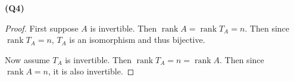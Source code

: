 \documentclass[12pt, a4paper]{article}
\newcommand{\rank}{\operatorname{rank}}
\begin{document}
\textbf{(Q4)}
\begin{proof}
    First suppose $A$ is invertible. Then $\rank A = \rank T_A = n$.
    Then since $\rank T_A = n$, $T_A$ is an isomorphism and thus bijective.

    Now assume $T_A$ is invertible. Then $\rank T_A = n = \rank A$.
    Then since $\rank A = n$, it is also invertible.
\end{proof}
\end{document}
